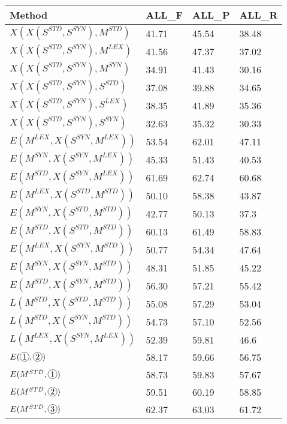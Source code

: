 \begin{table*}[]
\centering
\begin{tabular}{@{\makebox[2.5em][l]{\rownumber\space}}llll@{}}
\toprule
\textbf{Method} & \textbf{ALL\_F} & \textbf{ALL\_P} & \textbf{ALL\_R} \\ \midrule

%
$X(X(S^{STD}, S^{SYN}), M^{STD})$  & 41.71           & 45.54           & 38.48\\ 
$X(X(S^{STD}, S^{SYN}), M^{LEX})$  & 41.56          & 47.37           & 37.02\\ 
$X(X(S^{STD}, S^{SYN}), M^{SYN})$  & 34.91           & 41.43           & 30.16 \\ 
\midrule
%
$X(X(S^{STD}, S^{SYN}), S^{STD})$  & 37.08           & 39.88           & 34.65\\ 
$X(X(S^{STD}, S^{SYN}), S^{LEX})$  & 38.35          & 41.89           & 35.36\\ 
$X(X(S^{STD}, S^{SYN}), S^{SYN})$  & 32.63           & 35.32           & 30.33 \\ 
\midrule
$E(M^{LEX}, X(S^{SYN}, M^{LEX}))$      & 53.54	&	62.01	&	47.11           \\
$E(M^{SYN}, X(S^{SYN}, M^{LEX}))$      & 45.33	&	51.43	&	40.53           \\ 
$E(M^{STD}, X(S^{SYN}, M^{LEX}))$      & 61.69	&	62.74	&	60.68			\\
\midrule
$E(M^{LEX}, X(S^{STD}, M^{STD}))$      & 50.10	&	58.38	&	43.87           \\
$E(M^{SYN}, X(S^{STD}, M^{STD}))$      & 42.77	&	50.13	&	37.3           \\ 
$E(M^{STD}, X(S^{STD}, M^{STD}))$      & 60.13	&	61.49	&	58.83           \\
\midrule
$E(M^{LEX}, X(S^{SYN}, M^{STD}))$      & 50.77	&	54.34	&	47.64           \\
$E(M^{SYN}, X(S^{SYN}, M^{STD}))$      & 48.31	&	51.85	&	45.22          \\ 
\gdef\rownumber{\circlednumber{\stepcounter{magicrownumbers}\arabic{magicrownumbers}}}%
$E(M^{STD}, X(S^{SYN}, M^{STD}))$      & 56.30	&	57.21	&	55.42           \\

\midrule
%
$L(M^{STD}, X(S^{STD}, M^{STD}))$      & 55.08           & 57.29          & 53.04           \\ 
$L(M^{STD}, X(S^{SYN}, M^{STD}))$      & 54.73           & 57.10          & 52.56           \\ 
$L(M^{LEX}, X(S^{SYN}, M^{LEX}))$      & 52.39           & 59.81           & 46.6	           \\  
\midrule
%
$E(\circlednumber{1}, \circlednumber{2})$      & 58.17          & 59.66           & 56.75	          \\ \midrule
%
$E(M^{STD}, \circlednumber{1})$      & 58.73          & 59.83     & 57.67	  \\
$E(M^{STD}, \circlednumber{2})$      & 59.51          & 60.19  & 58.85	  \\
$E(M^{STD}, \circlednumber{3})$      & 62.37          & 63.03  & 61.72	  \\
\midrule


\end{tabular}
\end{table*}
